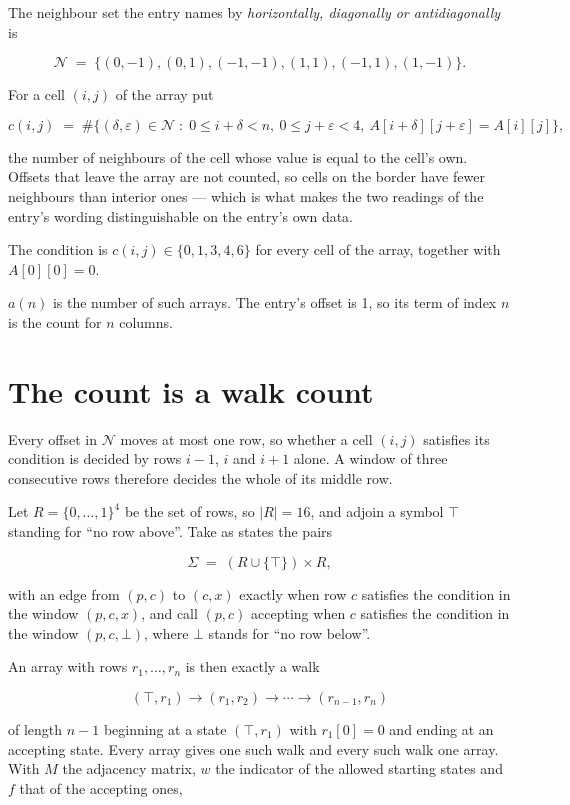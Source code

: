 \documentclass[11pt]{article}
\theoremstyle{definition}
\begin{document}
The neighbour set the entry names by {\itshape horizontally, diagonally or antidiagonally} is

\[\mathcal{N} \;=\; \{(0,-1), (0,1), (-1,-1), (1,1), (-1,1), (1,-1)\}.\]

For a cell $(i,j)$ of the array put

\[c(i,j) \;=\; \#\bigl\{(\delta,\varepsilon)\in\mathcal{N} \;:\; 0\le i+\delta<n,\ 0\le j+\varepsilon<4,\ A[i+\delta][j+\varepsilon] = A[i][j]\bigr\},\]

the number of neighbours of the cell whose value is equal to the cell's own. Offsets that leave the array are not counted, so cells on the border have fewer neighbours than interior ones --- which is what makes the two readings of the entry's wording distinguishable on the entry's own data.

The condition is $c(i,j) \in \{0, 1, 3, 4, 6\}$ for every cell of the array, together with $A[0][0]=0$.

$a(n)$ is the number of such arrays. The entry's offset is 1, so its term of index $n$ is the count for $n$ columns.

\section{The count is a walk count}

Every offset in $\mathcal{N}$ moves at most one row, so whether a cell $(i,j)$ satisfies its condition is decided by rows $i-1$, $i$ and $i+1$ alone. A window of three consecutive rows therefore decides the whole of its middle row.

Let $R = \{0,\dots,1\}^{4}$ be the set of rows, so $|R| = 16$, and adjoin a symbol $\top$ standing for ``no row above''. Take as states the pairs

\[\Sigma \;=\; (R \cup \{\top\}) \times R,\]

with an edge from $(p,c)$ to $(c,x)$ exactly when row $c$ satisfies the condition in the window $(p,c,x)$, and call $(p,c)$ accepting when $c$ satisfies the condition in the window $(p,c,\bot)$, where $\bot$ stands for ``no row below''.

An array with rows $r_1,\dots,r_n$ is then exactly a walk

\[(\top,r_1) \to (r_1,r_2) \to \cdots \to (r_{n-1},r_n)\]

of length $n-1$ beginning at a state $(\top,r_1)$ with $r_1[0]=0$ and ending at an accepting state. Every array gives one such walk and every such walk one array. With $M$ the adjacency matrix, $w$ the indicator of the allowed starting states and $f$ that of the accepting ones,
\end{document}
